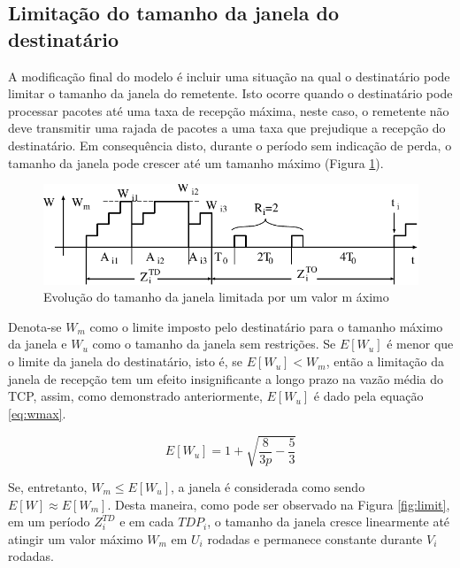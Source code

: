
\subsection{Limitação do tamanho da janela do destinatário}



A modificação final do modelo é incluir uma situação na qual o destinatário pode limitar o tamanho da janela do remetente. Isto ocorre quando o destinatário pode processar pacotes até uma taxa de recepção máxima, neste caso, o remetente não deve transmitir uma rajada de pacotes a uma taxa que prejudique a recepção do destinatário. Em consequência disto, durante o período sem indicação de perda, o tamanho da janela pode crescer até um tamanho máximo (Figura \ref{fig:max}). 

\begin{figure}[ht]
  \centering
  \includegraphics[scale=0.8]{figs/windowmax.pdf}
  \caption{Evolução do tamanho da janela limitada por um valor m
áximo}
  \label{fig:max}
\end{figure}

Denota-se $W_m$ como o limite imposto pelo destinatário para o tamanho máximo da janela e $W_u$ como o tamanho da janela sem restrições. Se $E[W_u]$ é menor que o limite da janela do destinatário, isto é, se $E[W_u]<W_m$, então a limitação da janela de recepção tem um efeito insignificante a longo prazo na vazão média do TCP, assim, como demonstrado anteriormente, $E[W_u]$
 é dado pela equação \ref{eq:wmax}. 

\begin{equation} \label{eq:wmax}
E[W_u]= 1 + \sqrt{\frac{8}{3p} - \frac{5}{3}}
\end{equation}

Se, entretanto, $W_m \leq E[W_u]$, a janela é considerada como sendo $E[W] \approx E[W_m]$. Desta maneira, como pode ser observado na Figura \ref{fig:limit}, em um período $Z_i^{TD}$ e em cada $TDP_i$, o tamanho da janela cresce linearmente até atingir um valor máximo $W_m$ em $U_i$ rodadas e permanece constante durante $V_i$ rodadas.

